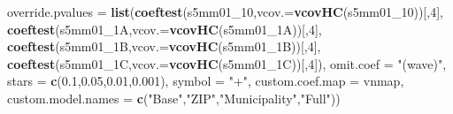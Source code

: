 \documentclass[
]{article}
\newenvironment{Shaded}{\begin{snugshade}}{\end{snugshade}}
\newcommand{\DataTypeTok}[1]{\textcolor[rgb]{0.13,0.29,0.53}{#1}}
\newcommand{\DecValTok}[1]{\textcolor[rgb]{0.00,0.00,0.81}{#1}}
\newcommand{\FloatTok}[1]{\textcolor[rgb]{0.00,0.00,0.81}{#1}}
\newcommand{\KeywordTok}[1]{\textcolor[rgb]{0.13,0.29,0.53}{\textbf{#1}}}
\newcommand{\NormalTok}[1]{#1}
\newcommand{\StringTok}[1]{\textcolor[rgb]{0.31,0.60,0.02}{#1}}
\begin{document}
\begin{Shaded}
\begin{Highlighting}[]
          \DataTypeTok{override.pvalues =} \KeywordTok{list}\NormalTok{(}\KeywordTok{coeftest}\NormalTok{(s5mm01_}\DecValTok{10}\NormalTok{,}\DataTypeTok{vcov.=}\KeywordTok{vcovHC}\NormalTok{(s5mm01_}\DecValTok{10}\NormalTok{))[,}\DecValTok{4}\NormalTok{],}
                                  \KeywordTok{coeftest}\NormalTok{(s5mm01_1A,}\DataTypeTok{vcov.=}\KeywordTok{vcovHC}\NormalTok{(s5mm01_1A))[,}\DecValTok{4}\NormalTok{],}
                                  \KeywordTok{coeftest}\NormalTok{(s5mm01_1B,}\DataTypeTok{vcov.=}\KeywordTok{vcovHC}\NormalTok{(s5mm01_1B))[,}\DecValTok{4}\NormalTok{],}
                                  \KeywordTok{coeftest}\NormalTok{(s5mm01_1C,}\DataTypeTok{vcov.=}\KeywordTok{vcovHC}\NormalTok{(s5mm01_1C))[,}\DecValTok{4}\NormalTok{]),}
          \DataTypeTok{omit.coef =} \StringTok{"(wave)"}\NormalTok{, }\DataTypeTok{stars =} \KeywordTok{c}\NormalTok{(}\FloatTok{0.1}\NormalTok{,}\FloatTok{0.05}\NormalTok{,}\FloatTok{0.01}\NormalTok{,}\FloatTok{0.001}\NormalTok{), }\DataTypeTok{symbol =} \StringTok{"+"}\NormalTok{,}
          \DataTypeTok{custom.coef.map =}\NormalTok{ vnmap, }
          \DataTypeTok{custom.model.names =} \KeywordTok{c}\NormalTok{(}\StringTok{"Base"}\NormalTok{,}\StringTok{"ZIP"}\NormalTok{,}\StringTok{"Municipality"}\NormalTok{,}\StringTok{"Full"}\NormalTok{))}
\end{Highlighting}
\end{Shaded}
\end{document}
